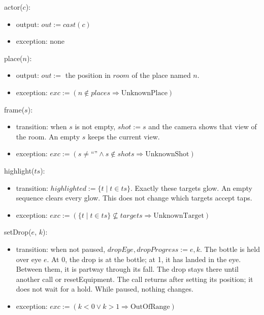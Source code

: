 \documentclass[10pt, titlepage]{article}
\newcommand{\T}[1]{\mathit{#1}}          %
\newcommand{\out}{\mathit{out}}
\newcommand{\exc}{\mathit{exc}}
\begin{document}
\begin{samepage}
\noindent actor($c$):
\begin{itemize}
\item output: $\out := \T{cast}(c)$
\item exception: none
\end{itemize}
\end{samepage}
\par\pagebreak[0]

\begin{samepage}
\noindent place($n$):
\begin{itemize}
\item output: $\out :=$ the position in $\T{room}$ of the place named $n$.
\item exception: $\exc := (n \notin \T{places} \Rightarrow
  \text{UnknownPlace})$
\end{itemize}
\end{samepage}
\par\pagebreak[0]

\begin{samepage}
\noindent frame($s$):
\begin{itemize}
\item transition: when $s$ is not empty, $\T{shot} := s$ and the camera
  shows that view of the room. An empty $s$ keeps the current view.
\item exception: $\exc := (s \neq \text{``''} \wedge s \notin \T{shots}
  \Rightarrow \text{UnknownShot})$
\end{itemize}
\end{samepage}
\par\pagebreak[0]

\begin{samepage}
\noindent highlight($\T{ts}$):
\begin{itemize}
\item transition: $\T{highlighted} := \{t \mid t \in \T{ts}\}$. Exactly
  these targets glow. An empty sequence clears every glow. This does not
  change which targets accept taps.
\item exception: $\exc := (\{t \mid t \in \T{ts}\} \not\subseteq \T{targets}
  \Rightarrow \text{UnknownTarget})$
\end{itemize}
\end{samepage}
\par\pagebreak[0]

\begin{samepage}
\noindent setDrop($e$, $k$):
\begin{itemize}
\item transition: when not paused, $\T{dropEye}, \T{dropProgress} := e,k$.
  The bottle is held over eye $e$. At 0, the drop is at the bottle; at 1,
  it has landed in the eye. Between them, it is partway through its fall.
  The drop stays there until another call or resetEquipment. The call
  returns after setting its position; it does not wait for a hold.
  While paused, nothing changes.
\item exception: $\exc := (k < 0 \vee k > 1 \Rightarrow \text{OutOfRange})$
\end{itemize}
\end{samepage}
\par\pagebreak[0]
\end{document}
